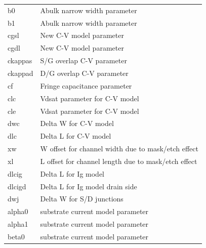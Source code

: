 \begin{longtable}{l l}
{\small b0} & {\small Abulk narrow width parameter} \\
{\small b1} & {\small Abulk narrow width parameter} \\

{\small cgsl} & {\small New C-V model parameter} \\
{\small cgdl} & {\small New C-V model parameter} \\
{\small ckappas} & {\small S/G overlap C-V parameter } \\
{\small ckappad} & {\small D/G overlap C-V parameter} \\
{\small cf} & {\small Fringe capacitance parameter} \\
{\small clc} & {\small Vdsat parameter for C-V model} \\
{\small cle} & {\small Vdsat parameter for C-V model} \\
{\small dwc} & {\small Delta W for C-V model} \\
{\small dlc} & {\small Delta L for C-V model} \\
{\small xw} & {\small W offset for channel width due to mask/etch effect} \\
{\small xl} & {\small L offset for channel length due to mask/etch effect} \\
{\small dlcig} & {\small Delta L for Ig model} \\
{\small dlcigd} & {\small Delta L for Ig model drain side} \\
{\small dwj} & {\small Delta W for S/D junctions} \\

{\small alpha0} & {\small substrate current model parameter} \\
{\small alpha1} & {\small substrate current model parameter} \\
{\small beta0} & {\small substrate current model parameter} \\


\end{longtable}
